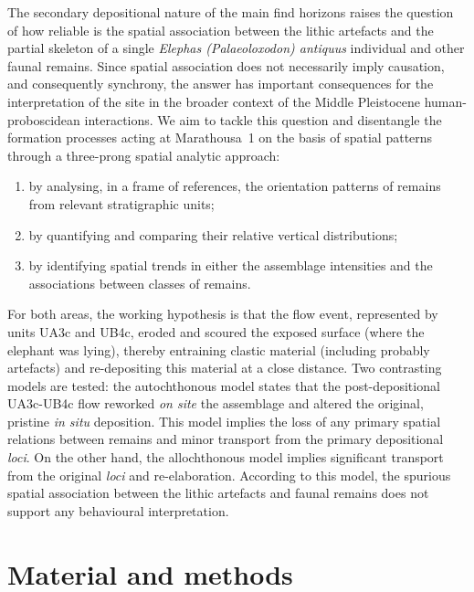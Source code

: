 \documentclass[preprint,authoryear,times]{elsarticle} %
\begin{document}
The secondary depositional nature of the main find horizons raises the question of how reliable is the spatial association between the lithic artefacts and the partial skeleton of a single \emph{Elephas (Palaeoloxodon) antiquus} individual and other faunal remains. Since spatial association does not necessarily imply causation, and consequently synchrony, the answer has important consequences for the interpretation of the site in the broader context of the Middle Pleistocene human-proboscidean interactions. We aim to tackle this question and disentangle the formation processes acting at Marathousa~1 on the basis of spatial patterns through a three-prong spatial analytic approach:
\begin{enumerate}
\item by analysing, in a frame of references, the orientation patterns of remains from relevant stratigraphic units;
\item by quantifying and comparing their relative vertical distributions;
\item by identifying spatial trends in either the assemblage intensities and the associations between classes of remains.
\end{enumerate}

For both areas, the working hypothesis is that the flow event, represented by units UA3c and UB4c, eroded and scoured the exposed surface (where the elephant was lying), thereby entraining clastic material (including probably artefacts) and re-depositing this material at a close distance. Two contrasting models are tested: the autochthonous model \citep[][sensu]{Dominguez-Rodrigo2012} states that the post-depositional UA3c-UB4c flow reworked \emph{on site} the assemblage and altered the original, pristine \emph{in situ} deposition. This model implies the loss of any primary spatial relations between remains and minor transport from the primary depositional \emph{loci}. %
On the other hand, the allochthonous model \citep[][sensu]{Dominguez-Rodrigo2012} implies significant transport from the original \emph{loci} and re-elaboration.%
According to this model, the spurious spatial association between the lithic artefacts and faunal remains does not support any behavioural interpretation.

\section{Material and methods}
\end{document}
